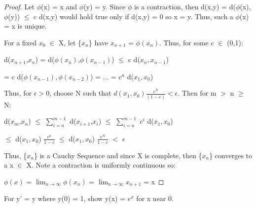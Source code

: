     \begin{proof}
        Let $\phi$(x) = x and $\phi$(y) = y. Since $\phi$ is a contraction,
        then d(x,y) = d($\phi$(x),$\phi$(y)) $\leq$ c d(x,y)
        would hold true only if d(x,y) = 0 so x = y.
        Thus, such a $\phi$(x) = x is unique.

        For a fixed $x_0$ $\in$ X, let \{$x_n$\} have
        $x_{n+1}$ = $\phi(x_n)$. Thus, for some c $\in$ (0,1):

        \hspace{0.5cm}
        d($x_{n+1}$,$x_n$)
        = d($\phi(x_n)$,$\phi(x_{n-1})$)
        $\leq$ c d($x_n,x_{n-1}$)

        \hspace{2.6cm}
        = c d($\phi(x_{n-1}),\phi(x_{n-2})$)
        = ...
        = $c^n$ d($x_1,x_0$)

        Thus, for $\epsilon > 0$, choose N such that
        $d(x_1,x_0)\frac{c^N}{(1-c)} < \epsilon$.
        Then for m $>$ n $\geq$ N:

        \hspace{0.5cm}
        d($x_{m}$,$x_n$)
        $\leq$ $\sum_{i=n}^{m-1}$ d($x_{i+1}$,$x_i$)
        $\leq$ $\sum_{i=n}^{m-1}$ $c^i$ d($x_1,x_0$)

        \hspace{2.25cm}
        $\leq$ d($x_1,x_0$) $\frac{c^n}{1-c}$
        $\leq$ d($x_1,x_0$) $\frac{c^N}{1-c}$
        $<$ $\epsilon$

        Thus, \{$x_n$\} is a Cauchy Sequence and since X is complete,
        then \{$x_n$\} converges to a x $\in$ X.
        Note a contraction is uniformly continuous so:

        \hspace{0.5cm}
        $\phi(x)$
        = $\lim_{n \rightarrow \infty} \phi(x_n)$
        = $\lim_{n \rightarrow \infty} x_{n+1}$
        = x
    \end{proof}

    \vspace{0.5cm}



    \begin{example}
        For y' = y where y(0) = 1, show y(x) = $e^x$ for x near 0.
    \end{example}

